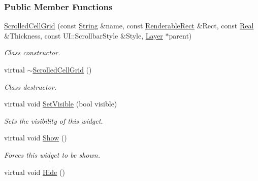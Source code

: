 \subsubsection*{Public Member Functions}
\begin{DoxyCompactItemize}
\item 
\hyperlink{classphys_1_1UI_1_1ScrolledCellGrid_a55568ced472f194c6fd6a07310b68561}{ScrolledCellGrid} (const \hyperlink{namespacephys_aa03900411993de7fbfec4789bc1d392e}{String} \&name, const \hyperlink{structphys_1_1UI_1_1RenderableRect}{RenderableRect} \&Rect, const \hyperlink{namespacephys_af7eb897198d265b8e868f45240230d5f}{Real} \&Thickness, const UI::ScrollbarStyle \&Style, \hyperlink{classphys_1_1UI_1_1Layer}{Layer} $\ast$parent)
\begin{DoxyCompactList}\small\item\em Class constructor. \item\end{DoxyCompactList}\item 
\hypertarget{classphys_1_1UI_1_1ScrolledCellGrid_a27a91d4fe26c101718f8593c8775f0cb}{
virtual \hyperlink{classphys_1_1UI_1_1ScrolledCellGrid_a27a91d4fe26c101718f8593c8775f0cb}{$\sim$ScrolledCellGrid} ()}
\label{classphys_1_1UI_1_1ScrolledCellGrid_a27a91d4fe26c101718f8593c8775f0cb}

\begin{DoxyCompactList}\small\item\em Class destructor. \item\end{DoxyCompactList}\item 
virtual void \hyperlink{classphys_1_1UI_1_1ScrolledCellGrid_aef5b78f205e75d33fff05623a1b61aa4}{SetVisible} (bool visible)
\begin{DoxyCompactList}\small\item\em Sets the visibility of this widget. \item\end{DoxyCompactList}\item 
virtual void \hyperlink{classphys_1_1UI_1_1ScrolledCellGrid_af75c87ada3a1bac3dda208485ebc5f94}{Show} ()
\begin{DoxyCompactList}\small\item\em Forces this widget to be shown. \item\end{DoxyCompactList}\item 
\hypertarget{classphys_1_1UI_1_1ScrolledCellGrid_a489a88ad115f0059dabb4519f6139bd8}{
virtual void \hyperlink{classphys_1_1UI_1_1ScrolledCellGrid_a489a88ad115f0059dabb4519f6139bd8}{Hide} ()}
\label{classphys_1_1UI_1_1ScrolledCellGrid_a489a88ad115f0059dabb4519f6139bd8}


\end{DoxyCompactItemize}
